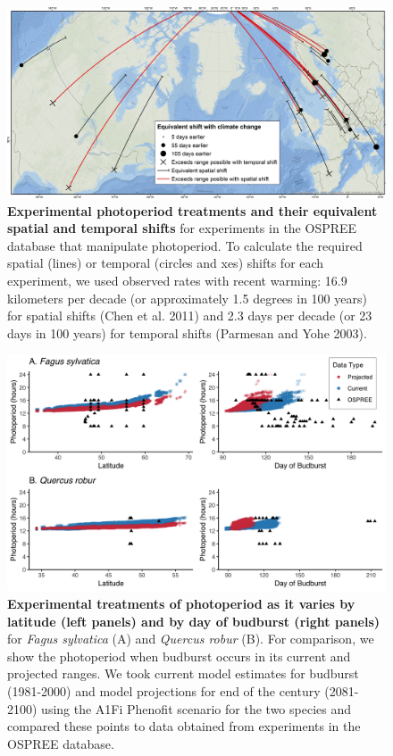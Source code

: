 \documentclass{article}
\begin{document}
\begin{figure}[p]
\centering
\includegraphics{..//..//analyses/photoperiod/figures/ospree_photopmap_fromblake.jpg} 
\caption{\textbf{Experimental photoperiod treatments and their equivalent spatial and temporal shifts} for experiments in the OSPREE database that manipulate photoperiod. To calculate the required spatial (lines) or temporal (circles and xes) shifts for each experiment, we used observed rates with recent warming: 16.9 kilometers per decade (or approximately 1.5 degrees in 100 years) for spatial shifts (Chen et al. 2011) and 2.3 days per decade (or 23 days in 100 years) for temporal shifts (Parmesan and Yohe 2003).}
 \label{fig:photomap}
 \end{figure}


 
 
\begin{figure}[p]
\includegraphics{..//..//analyses/photoperiod/figures/2D_actual_combined.png} 
\caption{\textbf{Experimental treatments of photoperiod as it varies by latitude (left panels) and by day of budburst (right panels)} for \textit{Fagus sylvatica} (A) and \textit{Quercus robur} (B). For comparison, we show the photoperiod when budburst occurs in its current and projected ranges. We took current model estimates for budburst (1981-2000) and model projections for end of the century (2081-2100) using the A1Fi Phenofit scenario \citep{duputie2015} for the two species and compared these points to data obtained from experiments in the OSPREE database.} 
 \label{fig:fagus}
 \end{figure}
 
\end{document}
